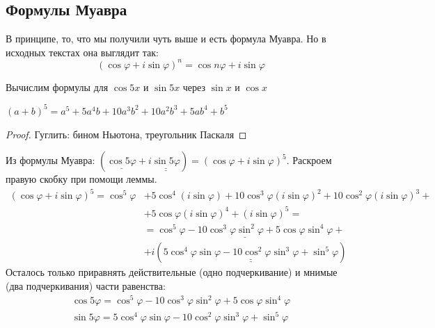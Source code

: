 \documentclass[12pt, a4paper]{article}
\begin{document}
    \subsection{Формулы Муавра}
    В принципе, то, что мы получили чуть выше и есть формула Муавра. Но в исходных текстах она выглядит так: \[
        (\cos \varphi + i \sin \varphi)^{n} = \cos n\varphi + i \sin \varphi 
    \] 
    \begin{exmp}
        Вычислим формулы для \( \cos 5x \) и \( \sin 5x \) через \( \sin x \) и \( \cos  x \)
        \begin{lem}
            \( (a + b)^{5} = a^{5} + 5a^{4}b + 10a^{3}b^2 + 10a^2b^3 + 5ab^{4} + b^{5}  \)
            
        \end{lem}
        \begin{proof}
            Гуглить: бином Ньютона, треугольник Паскаля
        \end{proof}

        Из формулы Муавра: \( (\underline{\cos 5 \varphi}+ i\underline{\underline{ \sin 5 \varphi}}) = (\cos  \varphi + i \sin  \varphi)^{5}  \). Раскроем правую скобку при помощи леммы. 
        \begin{align*}
            (\cos  \varphi + i \sin  \varphi)^{5} = \cos ^{5}\varphi &+ 5 \cos  ^{4}(i \sin \varphi)  + 10 \cos  ^3 \varphi(i \sin  \varphi)^2 + 10 \cos ^2\varphi(i \sin  \varphi)^3  + \\
            &+ 5 \cos \varphi (i \sin \varphi)^{4} + (i \sin \varphi)^{5} = \\
            & =  \underline{\cos ^{5}\varphi - 10 \cos ^3 \varphi \sin ^2\varphi + 5 \cos \varphi \sin ^{4} \varphi} + \\
            & + i (\underline{\underline{5 \cos ^{4} \varphi \sin \varphi - 10 \cos ^2\varphi \sin ^3 \varphi + \sin ^{5} \varphi}}  )
        \end{align*}
        Осталось только приравнять действительные (одно подчеркивание) и мнимые (два подчеркивания) части равенства:
        \begin{align*}
            \cos 5 \varphi = \cos ^{5}\varphi - 10 \cos ^3 \varphi \sin ^2\varphi + 5 \cos \varphi \sin ^{4} \varphi \\
            \sin 5\varphi = 5 \cos ^{4} \varphi \sin \varphi - 10 \cos ^2 \varphi \sin ^3 \varphi + \sin  ^{5}\varphi  
        \end{align*}
        
    \end{exmp}
\end{document}
